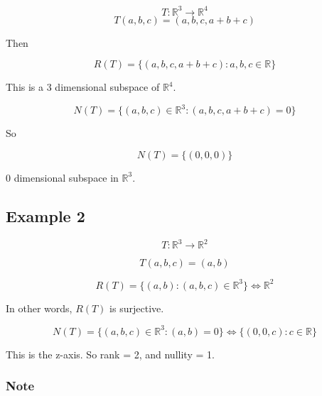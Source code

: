 \documentclass{article}
\newtheorem{one minute paper}[theorem]{One Minute Paper}
\begin{document}
\begin{equation}
    T: \mathbb{R}^3 \rightarrow \mathbb{R}^4
\end{equation}
\begin{equation}
    T(a,b,c) = (a,b,c,a + b + c)
\end{equation}

Then 

\begin{equation}
    R(T) = \{(a,b,c,a+b+c): a,b,c \in \mathbb{R}\}
\end{equation}

This is a 3 dimensional subspace of $\mathbb{R}^4$. 

\begin{equation}
    N(T) = \{(a,b,c) \in \mathbb{R}^3 : (a,b,c,a+b+c) = 0\}
\end{equation}

So 

\begin{equation}
    N(T) = \{(0,0,0)\}
\end{equation}

0 dimensional subspace in $\mathbb{R}^3$. 

\subsection*{Example 2}

\begin{equation}
    T: \mathbb{R}^3 \rightarrow \mathbb{R}^2
\end{equation}

\begin{equation}
    T(a,b,c) = (a,b)
\end{equation}

\begin{equation}
    R(T) = \{(a,b) : (a,b,c) \in \mathbb{R}^3\} \iff \mathbb{R}^2
\end{equation}

In other words, $R(T)$ is surjective. 

\begin{equation}
    N(T) = \{(a,b,c) \in \mathbb{R}^3: (a,b) = 0\} \iff \{(0,0,c) : c \in \mathbb{R}\}
\end{equation}

This is the z-axis. So rank = 2, and nullity = 1. 

\subsubsection*{Note}
\end{document}
